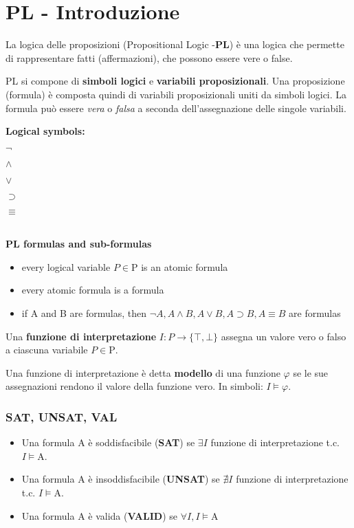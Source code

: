 \chapter{PL - Introduzione}
La logica delle proposizioni (Propositional Logic -\textbf{PL}) è una logica che permette di rappresentare fatti (affermazioni), che possono essere vere o false.

PL si compone di \textbf{simboli logici} e \textbf{variabili proposizionali}. Una proposizione (formula) è composta quindi di variabili proposizionali uniti da simboli logici. La formula può essere \textit{vera} o \textit{falsa} a seconda dell'assegnazione delle singole variabili.

\begin{fdefinition}
\textbf{Logical symbols:}
\begin{enumerate*}[label=(\arabic*)]
\item $\lnot$
\item $\land$
\item $\lor$
\item $\supset$
\item $\equiv$
\end{enumerate*}
\\
\textbf{PL formulas and sub-formulas}
\begin{itemize}
\item every logical variable $P \in \mathrm{P}$ is an atomic formula
\item every atomic formula is a formula
\item if A and B are formulas, then $\lnot A, A \land B, A \lor B, A \supset B, A \equiv B$ are formulas
\end{itemize}
\end{fdefinition}

Una \textbf{funzione di interpretazione} $I: \mathit{P} \to \lbrace \top, \bot \rbrace$ assegna un valore vero o falso a ciascuna variabile $P \in \mathrm{P}$.

Una funzione di interpretazione è detta \textbf{modello} di una funzione $\varphi$ se le sue assegnazioni rendono il valore della funzione vero. In simboli: $I \models \varphi$.

\subsection{SAT, UNSAT, VAL}

\begin{itemize}
\item Una formula $\mathrm{A}$ è soddisfacibile (\textbf{SAT}) se $\exists I$ funzione di interpretazione t.c. $I \models \mathrm{A}$.

\item Una formula $\mathrm{A}$ è insoddisfacibile (\textbf{UNSAT}) se $\nexists I$ funzione di interpretazione t.c. $I \models \mathrm{A}$.

\item Una formula $\mathrm{A}$ è valida (\textbf{VALID}) se $\forall I, I \models \mathrm{A}$
\end{itemize}

